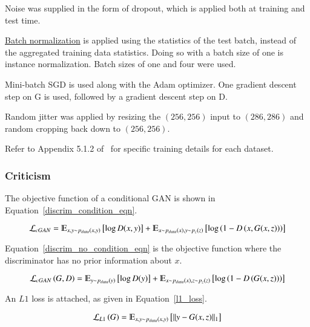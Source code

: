 \documentclass[a4paper, 12pt]{article}
\DeclarePairedDelimiter\norm{\lVert}{\rVert}%
\begin{document}
Noise was supplied in the form of dropout, which is applied both at training
and test time.

\hyperref[batchnorm]{Batch normalization} is applied using the statistics of
the test batch, instead of the aggregated training data statistics. Doing so
with a batch size of one is instance
normalization\citet{DBLP:journals/corr/UlyanovVL16}. Batch sizes of one and four
were used.

Mini-batch SGD is used along with the Adam optimizer. One gradient descent step
on G is used, followed by a gradient descent step on D.

Random jitter was applied by resizing the $(256, 256)$ input to $(286, 286)$
and random cropping back down to $(256, 256)$.

Refer to Appendix 5.1.2 of~\citet{DBLP:journals/corr/IsolaZZE16} for specific
training details for each dataset.

\subsubsection{Criticism}

The objective function of a conditional GAN is shown in Equation~\ref{discrim_condition_eqn}.

\begin{equation}
        \mathcal{L}_{cGAN} = \varmathbb{E}_{x, y \sim p_{data}(x, y)}\left[\log D(x, y)\right] +
                             \varmathbb{E}_{x \sim p_{data}(x), y \sim p_z (z)}\left[\log \left(1 - D\left(x, G(x, z)\right)\right)\right]
        \label{discrim_condition_eqn}
\end{equation}

Equation~\ref{discrim_no_condition_eqn} is the objective function where the
discriminator has no prior information about $x$.

\begin{equation}
        \mathcal{L}_{cGAN}\left(G, D\right) =
                \varmathbb{E}_{y \sim p_{data}(y)}\left[\log D(y)\right] +
                \varmathbb{E}_{x \sim p_{data}(x), z \sim p_z (z)}\left[\log \left(1 - D\left(G(x, z)\right)\right)\right]
        \label{discrim_no_condition_eqn}
\end{equation}

An $L1$ loss is attached, as given in Equation~\ref{l1_loss}.

\begin{equation}
        \mathcal{L}_{L1}\left(G\right) = \varmathbb{E}_{x, y \sim p_{data}(x, y)}\left[\norm{y - G(x, z)}_1\right]
        \label{l1_loss}
\end{equation}
\end{document}
